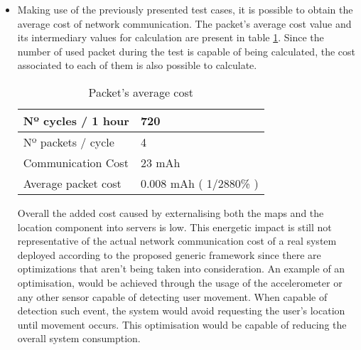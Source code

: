 \begin{itemize}
  
\item Making use of the previously presented test cases, it is possible to obtain the average cost of network communication. The packet's average cost value and its intermediary values for calculation are present in table \ref{table:packet}. Since the number of used packet during the test is capable of being calculated, the cost associated to each of them is also possible to calculate.   
  
\begin{table}[h!]  
\centering  
\begin{tabular}{ | m{5cm} | m{5cm} | }   
\hline  
Nº cycles / 1 hour &  720 \\   
\hline  
Nº packets / cycle & 4 \\   
\hline  
Communication Cost & 23 mAh \\   
\hline  
Average packet cost & 0.008 mAh ( 1/2880\% ) \\   
\hline  
\end{tabular}  
\caption[Packet's average cost]{Packet's average cost}  
\label{table:packet}  
\end{table}  
 
 
Overall the added cost caused by externalising both the maps and the location component into servers is low. This energetic impact is still not representative of the actual network communication cost of a real system deployed according to the proposed generic framework since there are optimizations that aren't being taken into consideration. An example of an optimisation, would be achieved through the usage of the accelerometer or any other sensor capable of detecting user movement. When capable of detection such event, the system would avoid requesting the user's location until movement occurs. This optimisation would be capable of reducing the overall system consumption. 
\end{itemize}  
  
 